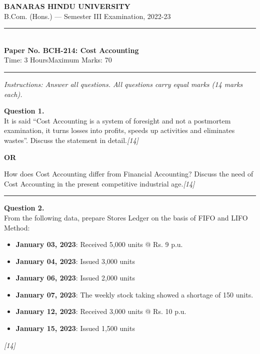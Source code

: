\documentclass[11pt,a4paper]{article}
\newcommand{\pts}[1]{\hfill   \textit{[#1]}}
\begin{document}
\begin{center}
  {\large\bfseries BANARAS HINDU UNIVERSITY}\\[2pt]
  {\normalsize B.Com. (Hons.) --- Semester III Examination, 2022-23}\\[6pt]
  \rule{0.8\linewidth}{0.5pt}\\[6pt]
  {\large\bfseries Paper No. BCH-214: Cost Accounting}\\[4pt]
  {\normalsize Time: 3 Hours\hfill Maximum Marks: 70}
\end{center}

\rule{\linewidth}{0.4pt}

\smallskip



\noindent   \textit{Instructions: Answer all questions. All questions carry equal marks (14 marks each).}

\bigskip




\noindent   \textbf{Question 1.} \\
It is said ``Cost Accounting is a system of foresight and not a postmortem examination, it turns losses into profits, speeds up activities and eliminates wastes''. Discuss the statement in detail.\pts{14}

\centerline{   \textbf{OR}}

How does Cost Accounting differ from Financial Accounting? Discuss the need of Cost Accounting in the present competitive industrial age.\pts{14}

\medskip\rule{\linewidth}{0.2pt}




\noindent   \textbf{Question 2.} \\
From the following data, prepare Stores Ledger on the basis of FIFO and LIFO Method:

\begin{itemize}
  \item   \textbf{January 03, 2023}: Received 5,000 units @ Rs. 9 p.u.
  \item   \textbf{January 04, 2023}: Issued 3,000 units
  \item   \textbf{January 06, 2023}: Issued 2,000 units
  \item   \textbf{January 07, 2023}: The weekly stock taking showed a shortage of 150 units.
  \item   \textbf{January 12, 2023}: Received 3,000 units @ Rs. 10 p.u.
  \item   \textbf{January 15, 2023}: Issued 1,500 units
\end{itemize}\pts{14}
\end{document}
